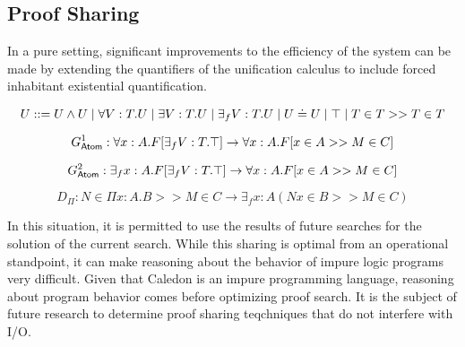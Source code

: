 \subsection{Proof Sharing}

In a pure setting, significant improvements to the efficiency of the system can be made by 
extending the quantifiers of the unification calculus to include forced inhabitant existential quantification.

\[
U ::= U \wedge U 
 \; | \; \forall V : T . U
 \; | \; \exists V : T . U 
 \; | \; \exists_f V : T . U 
 \; | \; U \doteq U
 \; | \; \top
 \; | \; T \in T >> T \in T
\]

\[
G^1_{\mathsf{Atom}} : \forall x : A . F[\exists_f V : T . \top]  \rightarrow \forall x : A . F[x \in A >> M \in C]
\]

\[
G^2_{\mathsf{Atom}} : \exists_f x : A . F[\exists_f V : T . \top]  \rightarrow \forall x : A . F[x \in A >> M \in C]
\]

\[
D_\Pi : N\in \Pi x : A . B >> M \in C \rightarrow \exists_f x : A ( N x \in B >> M \in C)
\]

In this situation, it is permitted to use the results of future searches for the solution of the current search.
While this sharing is optimal from an operational standpoint, it can make reasoning about the behavior 
of impure logic programs very difficult.  Given that Caledon is an impure programming language, reasoning about program
behavior comes before optimizing proof search.  It is the subject of future research to determine proof sharing teqchniques
that do not interfere with I/O. 
